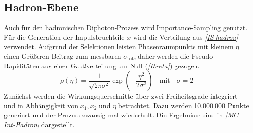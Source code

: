 \subsection{Hadron-Ebene}
Auch für den hadronischen Diphoton-Prozess wird Importance-Sampling genutzt. Für die Generation der Impulsbruchteile $x$ wird die Verteilung aus \textit{\autoref{IS-hadron}} verwendet. Aufgrund der Selektionen leisten Phasenraumpunkte mit kleinem $\eta$ einen Größeren Beitrag zum messbaren $\sigma_{\text{tot}}$, daher werden die Pseudo-Rapiditäten aus einer Gaußverteilung um Null (\textit{\autoref{IS-eta}}) gezogen.
\begin{equation}
\rho(\eta) = \frac{1}{\sqrt{2\pi \sigma^2}} \exp(-\frac{\eta^2}{2\sigma^2}) \quad \text{mit} \quad \sigma=2
\label{IS-eta}
\end{equation}
Zunächst werden die Wirkungsquerschnitte über zwei Freiheitsgrade integriert und in Abhängigkeit von $x_1, x_2$ und $\eta$ betrachtet. Dazu werden 10.000.000 Punkte generiert und der Prozess zwanzig mal wiederholt. Die Ergebnisse sind in \textit{\autoref{MC-Int-Hadron}} dargestellt.
